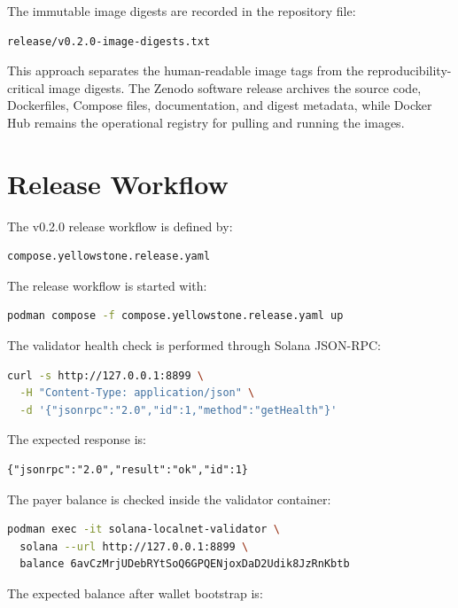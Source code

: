 \documentclass[11pt,a4paper]{article}
\begin{document}
The immutable image digests are recorded in the repository file:

\begin{lstlisting}
release/v0.2.0-image-digests.txt
\end{lstlisting}

This approach separates the human-readable image tags from the reproducibility-critical image digests. The Zenodo software release archives the source code, Dockerfiles, Compose files, documentation, and digest metadata, while Docker Hub remains the operational registry for pulling and running the images.

\section{Release Workflow}

The v0.2.0 release workflow is defined by:

\begin{lstlisting}
compose.yellowstone.release.yaml
\end{lstlisting}

The release workflow is started with:

\begin{lstlisting}[language=bash]
podman compose -f compose.yellowstone.release.yaml up
\end{lstlisting}

The validator health check is performed through Solana JSON-RPC:

\begin{lstlisting}[language=bash]
curl -s http://127.0.0.1:8899 \
  -H "Content-Type: application/json" \
  -d '{"jsonrpc":"2.0","id":1,"method":"getHealth"}'
\end{lstlisting}

The expected response is:

\begin{lstlisting}
{"jsonrpc":"2.0","result":"ok","id":1}
\end{lstlisting}

The payer balance is checked inside the validator container:

\begin{lstlisting}[language=bash]
podman exec -it solana-localnet-validator \
  solana --url http://127.0.0.1:8899 \
  balance 6avCzMrjUDebRYtSoQ6GPQENjoxDaD2Udik8JzRnKbtb
\end{lstlisting}

The expected balance after wallet bootstrap is:
\end{document}
